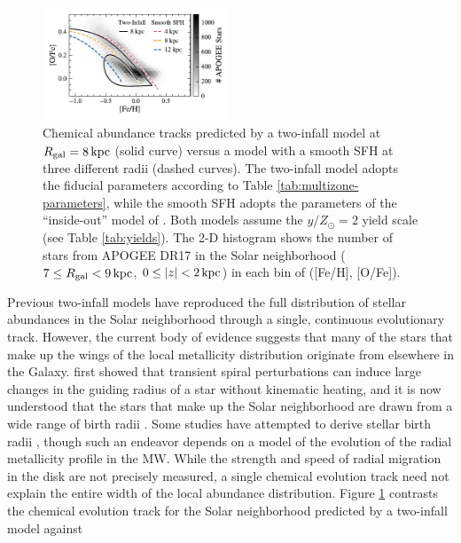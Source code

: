 \documentclass[twocolumn,twocolappendix,linenumbers]{aastex631}
\newcommand{\todo}[1]{{\color{red}#1}}
\newcommand{\yZ}[1]{$y/Z_\odot=#1$}
\newcommand{\kpc}{\,{\rm kpc}}
\begin{document}
\begin{figure}
    \centering
    \includegraphics[width=0.5\textwidth]{figures/smooth_vs_twoinfall.pdf}
    \caption{Chemical abundance tracks predicted by a two-infall model at $R_{\rm gal}=8\kpc$ (solid curve) versus a model with a smooth SFH at three different radii (dashed curves). The two-infall model adopts the fiducial parameters according to Table \ref{tab:multizone-parameters}, while the smooth SFH adopts the parameters of the ``inside-out'' model of \citet{johnson_stellar_2021}. Both models assume the \yZ{2} yield scale (see Table \ref{tab:yields}). The 2-D histogram shows the number of stars from APOGEE DR17 in the Solar neighborhood ($7\leq R_{\rm gal}<9\kpc$, $0\leq|z|<2\kpc$) in each bin of ([Fe/H], [O/Fe]).}
    \label{fig:smooth-vs-twoinfall}
\end{figure}

Previous two-infall models have reproduced the full distribution of stellar abundances in the Solar neighborhood through a single, continuous evolutionary track. However, the current body of evidence suggests that many of the stars that make up the wings of the local metallicity distribution originate from elsewhere in the Galaxy. \citet{sellwood_radial_2002} first showed that transient spiral perturbations can induce large changes in the guiding radius of a star without kinematic heating, and it is now understood that the stars that make up the Solar neighborhood are drawn from a wide range of birth radii \citep[e.g.,][]{schonrich_chemical_2009,frankel_measuring_2018,lehmann_probing_2024}. Some studies have attempted to derive stellar birth radii \citep[e.g.,][]{ratcliffe_unveiling_2023,lu_there_2024}, though such an endeavor depends on a model of the evolution of the radial metallicity profile in the MW. While the strength and speed of radial migration in the disk are not precisely measured, a single chemical evolution track need not explain the entire width of the local abundance distribution. Figure \ref{fig:smooth-vs-twoinfall} contrasts the chemical evolution track for the Solar neighborhood predicted by a two-infall model against 
\end{document}

